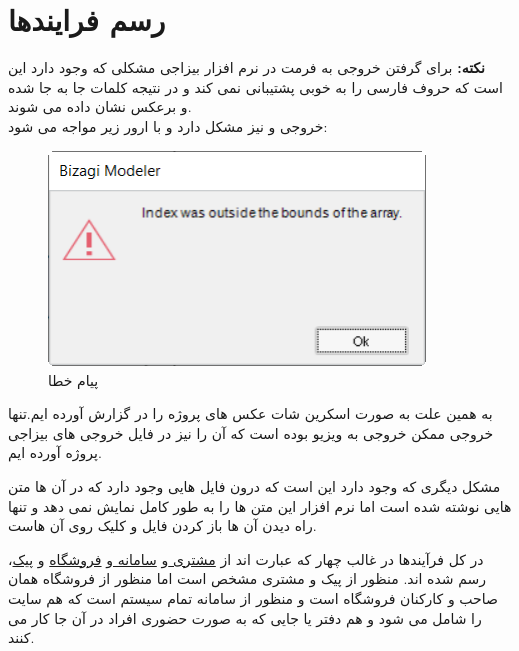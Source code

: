 \documentclass[12pt,a4paper]{article}
\begin{document}
\maketitle
\pagebreak
\tableofcontents
\pagebreak
\listoffigures
\pagebreak
\normalsize	



\pagebreak
\section{رسم فرایندها} \label{section.function}

\textbf{نکته:}
برای گرفتن خروجی به فرمت  در نرم افزار بیزاجی مشکلی که وجود دارد این است که حروف فارسی را به خوبی پشتیبانی نمی کند و در نتیجه کلمات جا به جا شده و برعکس نشان داده می شوند.\\
خروجی  و نیز مشکل دارد و با ارور زیر مواجه می شود:
	\begin{figure}[h!]
	\begin{center}
		\includegraphics[width=10cm]{images/Error.png}	
	\end{center}
	\caption{پیام خطا}
	\end{figure}


به همین علت به صورت اسکرین شات عکس های پروژه را در گزارش آورده ایم.تنها خروجی ممکن خروجی به ویزیو بوده است که آن را نیز در فایل  خروجی های بیزاجی پروژه آورده ایم.


مشکل دیگری که وجود دارد این است که درون فایل  هایی وجود دارد که در آن ها متن هایی نوشته شده است اما نرم افزار این متن ها را به طور کامل نمایش نمی دهد و تنها راه دیدن آن ها باز کردن فایل و کلیک روی آن هاست.


در کل فرآیندها در غالب چهار  که عبارت اند از \underline{مشتری }و \underline{سامانه }و \underline{فروشگاه} و \underline{پیک}، رسم شده اند. منظور از پیک و مشتری مشخص است اما منظور از فروشگاه همان صاحب و کارکنان فروشگاه است و منظور از سامانه تمام سیستم است که هم سایت را شامل می شود و هم دفتر یا جایی که به صورت حضوری افراد در آن جا کار می کنند.
\end{document}
